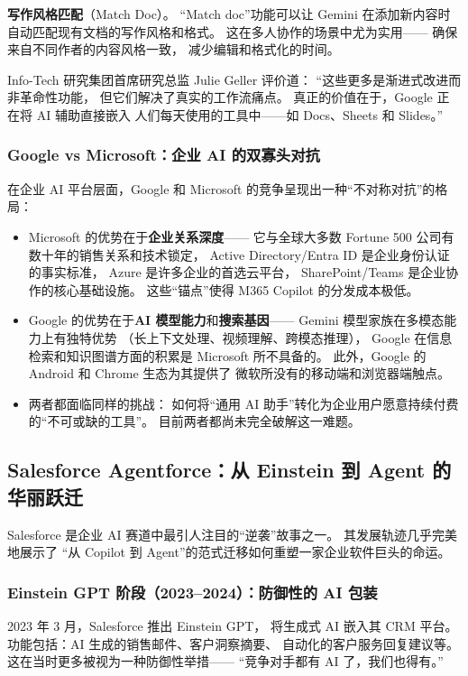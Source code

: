 \textbf{写作风格匹配}（Match Doc）。
``Match doc''功能可以让 Gemini 在添加新内容时
自动匹配现有文档的写作风格和格式。
这在多人协作的场景中尤为实用——
确保来自不同作者的内容风格一致，
减少编辑和格式化的时间。

Info-Tech 研究集团首席研究总监 Julie Geller 评价道：
``这些更多是渐进式改进而非革命性功能，
但它们解决了真实的工作流痛点。
真正的价值在于，Google 正在将 AI 辅助直接嵌入
人们每天使用的工具中——如 Docs、Sheets 和 Slides。''

\subsubsection{Google vs Microsoft：企业 AI 的双寡头对抗}
在企业 AI 平台层面，Google 和 Microsoft 的竞争呈现出一种``不对称对抗''的格局：

\begin{itemize}[noitemsep]
  \item Microsoft 的优势在于\textbf{企业关系深度}——
        它与全球大多数 Fortune 500 公司有数十年的销售关系和技术锁定，
        Active Directory/Entra ID 是企业身份认证的事实标准，
        Azure 是许多企业的首选云平台，
        SharePoint/Teams 是企业协作的核心基础设施。
        这些``锚点''使得 M365 Copilot 的分发成本极低。
  \item Google 的优势在于\textbf{AI 模型能力}和\textbf{搜索基因}——
        Gemini 模型家族在多模态能力上有独特优势
        （长上下文处理、视频理解、跨模态推理），
        Google 在信息检索和知识图谱方面的积累是 Microsoft 所不具备的。
        此外，Google 的 Android 和 Chrome 生态为其提供了
        微软所没有的移动端和浏览器端触点。
  \item 两者都面临同样的挑战：
        如何将``通用 AI 助手''转化为企业用户愿意持续付费的``不可或缺的工具''。
        目前两者都尚未完全破解这一难题。
\end{itemize}

\subsection{Salesforce Agentforce：从 Einstein 到 Agent 的华丽跃迁}

Salesforce 是企业 AI 赛道中最引人注目的``逆袭''故事之一。
其发展轨迹几乎完美地展示了
``从 Copilot 到 Agent''的范式迁移如何重塑一家企业软件巨头的命运。

\subsubsection{Einstein GPT 阶段（2023--2024）：防御性的 AI 包装}
2023 年 3 月，Salesforce 推出 Einstein GPT，
将生成式 AI 嵌入其 CRM 平台。
功能包括：AI 生成的销售邮件、客户洞察摘要、
自动化的客户服务回复建议等。
这在当时更多被视为一种防御性举措——
``竞争对手都有 AI 了，我们也得有。''

